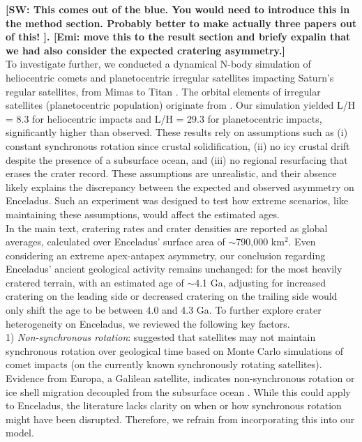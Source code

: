 \documentclass[preprint,11pt,3p,times,authoryear]{elsarticle}
\begin{document}
{\textbf{[SW: This comes out of the blue. You would need to introduce this in the method section. Probably better to make actually three papers out of this!
]. [Emi: move this to the result section and briefy expalin that we had also consider the expected
cratering asymmetry.]\\} 
To investigate further, we conducted a dynamical N-body simulation of heliocentric comets and planetocentric irregular satellites impacting Saturn's regular satellites, from Mimas to Titan \citep{Wong2021}. The  orbital elements of irregular satellites (planetocentric population) originate from \citet{Nesvorny2007}. Our simulation yielded L/H = 8.3 for heliocentric impacts and L/H = 29.3 for planetocentric impacts, significantly higher than observed. These results rely on assumptions such as (i) constant synchronous rotation since crustal solidification, (ii) no icy crustal drift despite the presence of a subsurface ocean, and (iii) no regional resurfacing that erases the crater record. These assumptions are unrealistic, and their absence likely explains the discrepancy between the expected and observed asymmetry on Enceladus. Such an experiment was designed to test how extreme scenarios, like maintaining these assumptions, would affect the estimated ages.\\

In the main text, cratering rates and crater densities are reported as global averages, calculated over Enceladus' surface area of $\sim$790,000 km$^2$. Even considering an extreme apex-antapex asymmetry, our conclusion regarding Enceladus' ancient geological activity remains unchanged: for the most heavily cratered terrain, with an estimated age of $\sim$4.1 Ga, adjusting for increased cratering on the leading side or decreased cratering on the trailing side would only shift the age to be between 4.0 and 4.3 Ga. To further explore crater heterogeneity on Enceladus, we reviewed the following key factors.\\

1) \textit{Non-synchronous rotation}: \citet{Zahnle2001} suggested that satellites may not maintain synchronous rotation over geological time based on Monte Carlo simulations of comet impacts (on the currently known synchronously rotating satellites). Evidence from Europa, a Galilean satellite, indicates non-synchronous rotation or ice shell migration decoupled from the subsurface ocean \citep{Kattenhorn2009,Collins2009}. While this could apply to Enceladus, the literature lacks clarity on when or how synchronous rotation might have been disrupted. Therefore, we refrain from incorporating this into our model.\\

}
\end{document}
